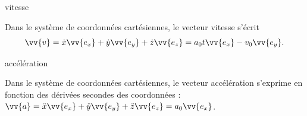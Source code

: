 

\begin{enonce}
	  vitesse
\end{enonce}


\begin{corrige}
Dans le système de coordonnées cartésiennes, le vecteur vitesse s'écrit 
\[
\vv{v}=\dot{x}\vv{e_x}+\dot{y}\vv{e_y}+\dot{z}\vv{e_z}=a_0 t \vv{e_x} - v_0 \vv{e_y}.
\]
\end{corrige}



\begin{enonce}
	 accélération
\end{enonce}


\begin{corrige}
 Dans le système de coordonnées cartésiennes, le vecteur accélération s'exprime en fonction des dérivées secondes des coordonnées : $\vv{a} =\ddot{x}\vv{e_x}+\ddot{y}\vv{e_y}+\ddot{z}\vv{e_z}=a_0 \vv{e_x}$.
\end{corrige}

\finEntrainement






\hauteurLargeurCadreReponse		{2.5cm}{3cm}
\typeEntrainement				{} %
\initialisationEntrainement

